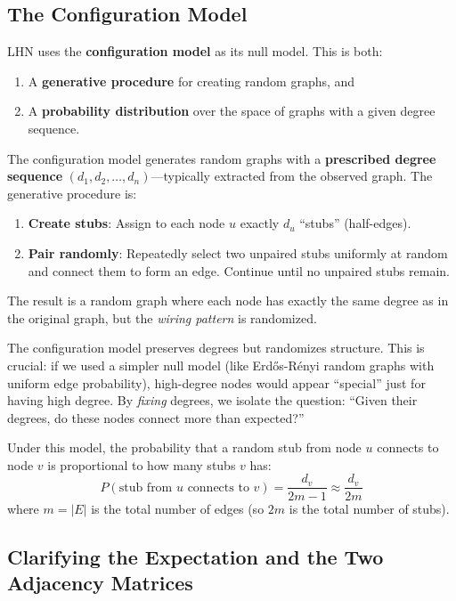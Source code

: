 \begin{notechapter}
\subsection{The Configuration Model}

LHN uses the \textbf{configuration model} as its null model. This is both:
\begin{enumerate}
    \item A \textbf{generative procedure} for creating random graphs, and
    \item A \textbf{probability distribution} over the space of graphs with a given degree sequence.
\end{enumerate}

\begin{definition}
The configuration model generates random graphs with a \textbf{prescribed degree sequence} $(d_1, d_2, \ldots, d_n)$---typically extracted from the observed graph. The generative procedure is:
\begin{enumerate}
    \item \textbf{Create stubs}: Assign to each node $u$ exactly $d_u$ ``stubs'' (half-edges).
    \item \textbf{Pair randomly}: Repeatedly select two unpaired stubs uniformly at random and connect them to form an edge. Continue until no unpaired stubs remain.
\end{enumerate}
The result is a random graph where each node has exactly the same degree as in the original graph, but the \emph{wiring pattern} is randomized.
\end{definition}

\begin{intuition}
The configuration model preserves degrees but randomizes structure. This is crucial: if we used a simpler null model (like Erd\H{o}s-R\'enyi random graphs with uniform edge probability), high-degree nodes would appear ``special'' just for having high degree. By \emph{fixing} degrees, we isolate the question: ``Given their degrees, do these nodes connect more than expected?''
\end{intuition}

Under this model, the probability that a random stub from node $u$ connects to node $v$ is proportional to how many stubs $v$ has:
\[
P(\text{stub from } u \text{ connects to } v) = \frac{d_v}{2m - 1} \approx \frac{d_v}{2m}
\]
where $m = |E|$ is the total number of edges (so $2m$ is the total number of stubs).

\subsection{Clarifying the Expectation and the Two Adjacency Matrices}


\end{notechapter}
